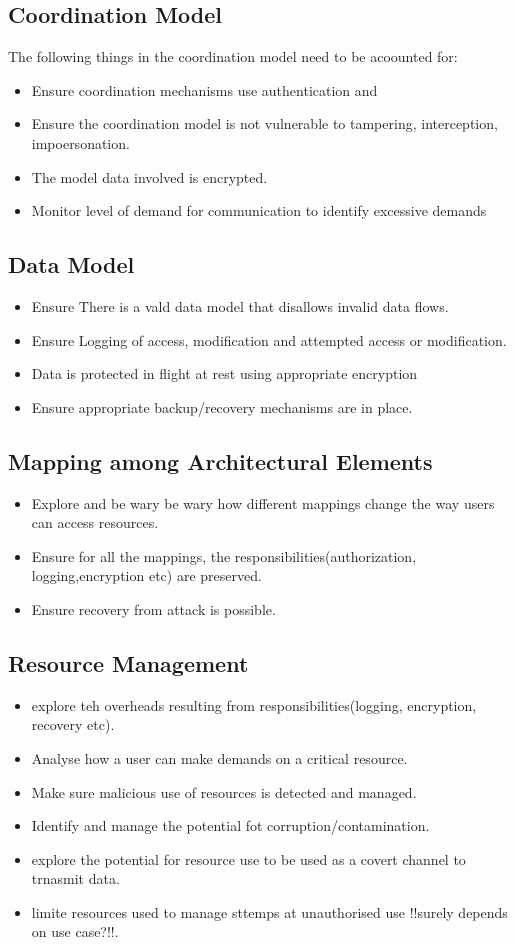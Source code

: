 \documentclass[a4paper]{report}
\begin{document}
\subsection{Coordination Model}
The following things in the coordination model need to be acoounted for:
\begin{itemize}
\item Ensure coordination mechanisms use authentication and 
\item Ensure the coordination model is not vulnerable to tampering, interception, impoersonation.
\item The model data involved is encrypted.
\item Monitor level of demand for communication to identify excessive demands
\end{itemize}
\subsection{Data Model}
\begin{itemize}
\item Ensure There is a vald data model that disallows invalid data flows.
\item Ensure Logging of access, modification and attempted access or modification.
\item Data is protected in flight at rest using appropriate encryption
\item Ensure appropriate backup/recovery mechanisms are in place. 
\end{itemize}

\subsection{Mapping among Architectural Elements}
\begin{itemize}
\item Explore and be wary be wary how different mappings change the way users can access resources.
\item Ensure for all the mappings, the responsibilities(authorization, logging,encryption etc) are preserved.
\item Ensure recovery from attack is possible.
\end{itemize}
\subsection{Resource Management}
\begin{itemize}
\item explore teh overheads resulting from responsibilities(logging, encryption, recovery etc).
\item Analyse how a user can make demands on a critical resource.
\item Make sure malicious use of resources is detected and managed.
\item Identify and manage the potential fot corruption/contamination.
\item explore the potential for resource use to be used as a covert channel to trnasmit data.
\item limite resources used to manage sttemps at unauthorised use !!surely depends on use case?!!.
\end{itemize}
\end{document}
